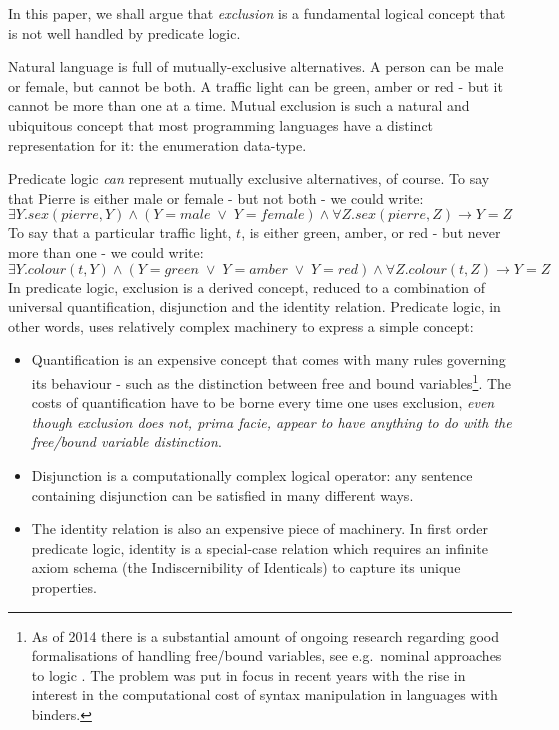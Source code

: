 In this paper, we shall argue that \emph{exclusion} is a fundamental logical concept that is not well handled by predicate logic.

Natural language is full of mutually-exclusive alternatives.
A person can be male or female, but cannot be both.
A traffic light can be green, amber or red - but it cannot be more than one at a time.
Mutual exclusion is such a natural and ubiquitous concept that most programming languages have a distinct representation for it: the enumeration data-type.

Predicate logic \emph{can} represent mutually exclusive alternatives, of course.
To say that Pierre is either male or female - but not both - we could write:
\[
\exists Y . sex(pierre,Y) \land (Y = male \; \lor \; Y = female) \land \forall Z . sex(pierre,Z) \rightarrow Y = Z
\]
To say that a particular traffic light, $t$, is either green, amber, or red - but never more than one - we could write:
\[
\exists Y . colour(t,Y) \land (Y = green \; \lor \; Y = amber \; \lor \; Y = red) \land \forall Z . colour(t,Z) \rightarrow Y = Z
\]
In predicate logic, exclusion is a derived concept, reduced to a combination of universal quantification, disjunction and the identity relation.
Predicate logic, in other words, uses relatively complex machinery to express a simple concept:
\begin{itemize}
\item Quantification is an expensive concept that comes with
      many rules governing its behaviour - such as the distinction
      between free and bound variables\footnote{As of 2014 there is a substantial amount
      of ongoing research regarding good formalisations of handling
      free/bound variables, see e.g.~nominal approaches to
      logic \cite{PittsAM:newaas,PittsAM:nomsetnasics}. The problem
      was put in focus in recent years with the rise in interest in the
      computational cost of syntax manipulation in languages with
      binders.}. The costs of quantification have to be
      borne every time one uses exclusion, \emph{even though exclusion does
      not, prima facie, appear to have anything to do with the
      free/bound variable distinction}.
\item Disjunction is a computationally complex logical operator: any sentence containing disjunction can be satisfied in many different ways.
\item The identity relation is also an expensive piece of machinery. In first order predicate logic, identity is a special-case relation which requires an infinite axiom schema (the Indiscernibility of Identicals) to capture its unique properties.
\end{itemize}

